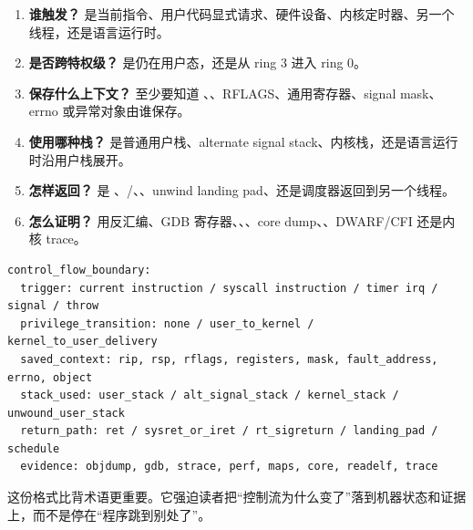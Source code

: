 \begin{enumerate}
  \item \textbf{谁触发？} 是当前指令、用户代码显式请求、硬件设备、内核定时器、另一个线程，还是语言运行时。
  \item \textbf{是否跨特权级？} 是仍在用户态，还是从 ring 3 进入 ring 0。
  \item \textbf{保存什么上下文？} 至少要知道 、、RFLAGS、通用寄存器、signal mask、errno 或异常对象由谁保存。
  \item \textbf{使用哪种栈？} 是普通用户栈、alternate signal stack、内核栈，还是语言运行时沿用户栈展开。
  \item \textbf{怎样返回？} 是 、/、、unwind landing pad、还是调度器返回到另一个线程。
  \item \textbf{怎么证明？} 用反汇编、GDB 寄存器、、、core dump、、DWARF/CFI 还是内核 trace。
\end{enumerate}

\begin{lstlisting}[numbers=none,caption={控制流边界的统一记录格式}]
control_flow_boundary:
  trigger: current instruction / syscall instruction / timer irq / signal / throw
  privilege_transition: none / user_to_kernel / kernel_to_user_delivery
  saved_context: rip, rsp, rflags, registers, mask, fault_address, errno, object
  stack_used: user_stack / alt_signal_stack / kernel_stack / unwound_user_stack
  return_path: ret / sysret_or_iret / rt_sigreturn / landing_pad / schedule
  evidence: objdump, gdb, strace, perf, maps, core, readelf, trace
\end{lstlisting}

这份格式比背术语更重要。它强迫读者把“控制流为什么变了”落到机器状态和证据上，而不是停在“程序跳到别处了”。

